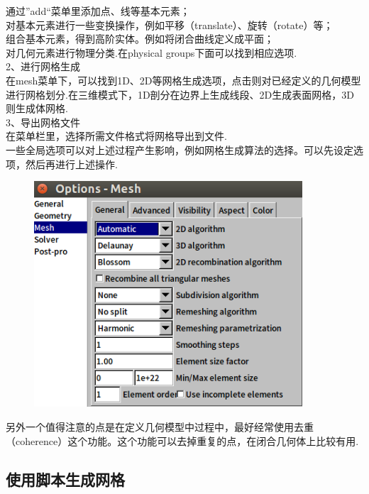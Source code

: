 \documentclass[12pt]{article}
\begin{document}
\begin{CJK}{UTF8}{gkai}
	通过”add“菜单里添加点、线等基本元素；\\
	
	对基本元素进行一些变换操作，例如平移（translate）、旋转（rotate）等；\\
	
	组合基本元素，得到高阶实体。例如将闭合曲线定义成平面；\\
	
	对几何元素进行物理分类.在physical groups下面可以找到相应选项.\\
	
	2、进行网格生成\\
	
	在mesh菜单下，可以找到1D、2D等网格生成选项，点击则对已经定义的几何模型进行网格划分.在三维模式下，1D剖分在边界上生成线段、2D生成表面网格，3D则生成体网格.\\
	
	3、导出网格文件\\
	
	在菜单栏里，选择所需文件格式将网格导出到文件.\\
	
	一些全局选项可以对上述过程产生影响，例如网格生成算法的选择。可以先设定选项，然后再进行上述操作.\\
	\begin{figure}[H]
		\centering
		\includegraphics[width=10cm]{op.png}
		\caption{}  		
	\end{figure}
	
	另外一个值得注意的点是在定义几何模型中过程中，最好经常使用去重（coherence）这个功能。这个功能可以去掉重复的点，在闭合几何体上比较有用.\\
	
	\subsection{使用脚本生成网格}
	

\end{CJK}
\end{document}

